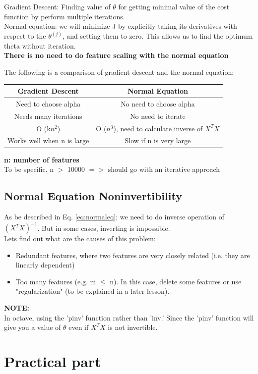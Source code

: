 Gradient Descent: Finding value of $\theta$ for getting minimal value of the cost function by perform multiple iterations. \\
Normal equation: we will minimize J by explicitly taking its derivatives with respect to the $\theta^{(j)}$, and setting them to zero. This allows us to find the optimum theta without iteration. \\

\textbf{There is no need to do feature scaling with the normal equation}

The following is a comparison of gradient descent and the normal equation:
\begin{table}[h]
	\centering
	\begin{tabular}{|c|c|}
		\toprule 
	Gradient Descent &	Normal Equation \\ \midrule
	Need to choose alpha &	No need to choose alpha \\
	Needs many iterations &	No need to iterate \\
	O (k$n^2$)	& O ($n^3$), need to calculate inverse of $X^TX$ \\
	Works well when n is large &	Slow if n is very large \\
	\bottomrule
\end{tabular}
\end{table}

\textbf{n: number of features}\\
To be specific, n $>$ 10000 $=>$ should go with an iterative approach

\subsection{Normal Equation Noninvertibility}
As be described in Eq. \ref{eq:normaleq}; we need to do inverse operation of $(X^TX)^{-1}$. But in some cases, inverting is impossible. \\
Lets find out what are the causes of this problem:
\begin{itemize}
	\item Redundant features, where two features are very closely related (i.e. they are linearly dependent)
	\item Too many features (e.g. m $\leq$ n). In this case, delete some features or use "regularization" (to be explained in a later lesson).
\end{itemize}

\textbf{NOTE:} \\
In octave, using the 'pinv' function rather than 'inv.' Since the 'pinv' function will give you a value of $\theta$ even if $X^TX$ is not invertible.

\section{Practical part}